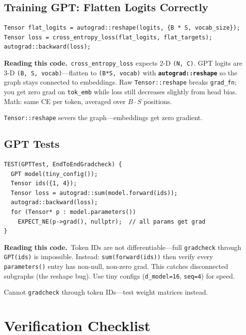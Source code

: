\documentclass[11pt,a4paper]{article}
\newcommand{\explain}{\par\smallskip\noindent}
\newcommand{\exhead}{\textbf{Reading this code.}\ }
\begin{document}
\subsection{Training GPT: Flatten Logits Correctly}

\begin{lstlisting}[style=cpp]
Tensor flat_logits = autograd::reshape(logits, {B * S, vocab_size});
Tensor loss = cross_entropy_loss(flat_logits, flat_targets);
autograd::backward(loss);
\end{lstlisting}
\explain\exhead \texttt{cross\_entropy\_loss} expects 2-D \texttt{(N, C)}. GPT logits are 3-D
\texttt{(B, S, vocab)}---flatten to \texttt{(B*S, vocab)} with \textbf{\texttt{autograd::reshape}}
so the graph stays connected to embeddings. Raw \texttt{Tensor::reshape} breaks \texttt{grad\_fn};
you get zero grad on \texttt{tok\_emb} while loss still decreases slightly from head bias. Math:
same CE per token, averaged over $B \cdot S$ positions.

\texttt{Tensor::reshape} severs the graph---embeddings get zero gradient.

\subsection{GPT Tests}

\begin{lstlisting}[style=cpp]
TEST(GPTTest, EndToEndGradcheck) {
  GPT model(tiny_config());
  Tensor ids({1, 4});
  Tensor loss = autograd::sum(model.forward(ids));
  autograd::backward(loss);
  for (Tensor* p : model.parameters())
    EXPECT_NE(p->grad(), nullptr);  // all params get grad
}
\end{lstlisting}
\explain\exhead Token IDs are not differentiable---full \texttt{gradcheck} through \texttt{GPT(ids)}
is impossible. Instead: \texttt{sum(forward(ids))} then verify every \texttt{parameters()} entry
has non-null, non-zero grad. This catches disconnected subgraphs (the reshape bug). Use tiny
configs (\texttt{d\_model=16}, \texttt{seq=4}) for speed.

Cannot \texttt{gradcheck} through token IDs---test weight matrices instead.

\section{Verification Checklist}
\label{sec:verify}
\end{document}
